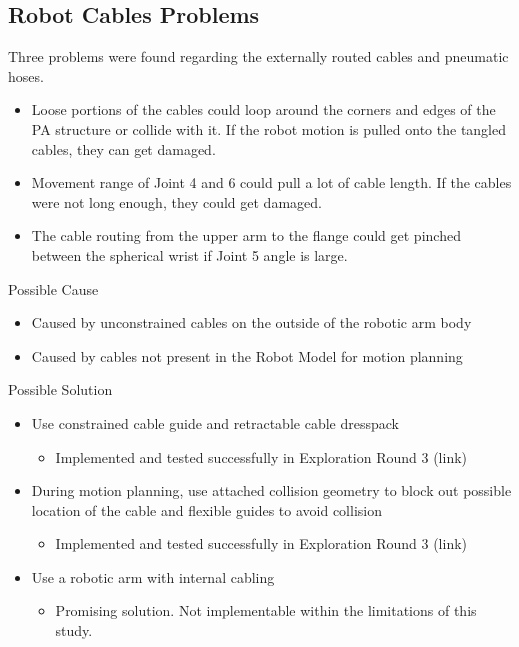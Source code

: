 \subsection{Robot Cables Problems}
\label{subsection:exploration-2-robot-cables-problems}

Three problems were found regarding the externally routed cables and pneumatic hoses. 
\begin{itemize}
    \item Loose portions of the cables could loop around the corners and edges of the PA structure or collide with it. If the robot motion is pulled onto the tangled cables, they can get damaged.
    \item Movement range of Joint 4 and 6 could pull a lot of cable length. If the cables were not long enough, they could get damaged.
    \item The cable routing from the upper arm to the flange could get pinched between the spherical wrist if Joint 5 angle is large.
\end{itemize}


Possible Cause

\begin{itemize}
    \item Caused by unconstrained cables on the outside of the robotic arm body
    \item Caused by cables not present in the Robot Model for motion planning
\end{itemize}

Possible Solution
\begin{itemize}
    \item Use constrained cable guide and retractable cable dresspack
    \begin{itemize}
        \item Implemented and tested successfully in Exploration Round 3 (link)
    \end{itemize}
    \item During motion planning, use attached collision geometry to block out possible location of the cable and flexible guides to avoid collision
    \begin{itemize}
        \item Implemented and tested successfully in Exploration Round 3 (link)
    \end{itemize}
    \item Use a robotic arm with internal cabling
    \begin{itemize}
        \item Promising solution. Not implementable within the limitations of this study.
    \end{itemize}
\end{itemize}

